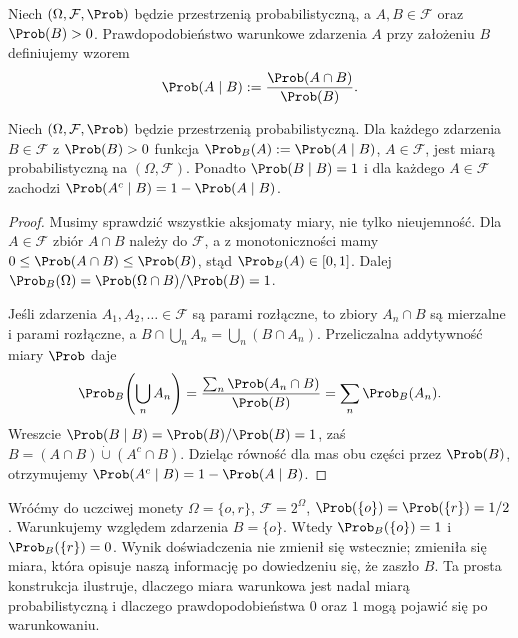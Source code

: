 \begin{definicja}
Niech $(\Omega,\mathcal F,\Prob)$ będzie przestrzenią probabilistyczną,
a $A,B\in\mathcal F$ oraz $\Prob(B)>0$.
Prawdopodobieństwo warunkowe zdarzenia $A$ przy założeniu $B$
definiujemy wzorem
\begin{equation}\label{eq:cond}
\Prob(A\mid B):=\frac{\Prob(A\cap B)}{\Prob(B)}.
\end{equation}
\end{definicja}

\begin{stwierdzenie}
Niech $(\Omega,\mathcal F,\Prob)$ będzie przestrzenią probabilistyczną.
Dla każdego zdarzenia $B\in\mathcal F$ z $\Prob(B)>0$
funkcja $\Prob_B(A):=\Prob(A\mid B)$, $A\in\mathcal F$,
jest miarą probabilistyczną na $(\Omega,\mathcal F)$.
Ponadto $\Prob(B\mid B)=1$ i dla każdego $A\in\mathcal F$
zachodzi $\Prob(A^c\mid B)=1-\Prob(A\mid B)$.
\end{stwierdzenie}
\begin{proof}
Musimy sprawdzić wszystkie aksjomaty miary, nie tylko
nieujemność. Dla $A\in\mathcal F$ zbiór $A\cap B$ należy do $\mathcal F$,
a z monotoniczności mamy $0\leq\Prob(A\cap B)\leq\Prob(B)$, stąd
$\Prob_B(A)\in[0,1]$. Dalej
$\Prob_B(\Omega)=\Prob(\Omega\cap B)/\Prob(B)=1$.

Jeśli zdarzenia $A_1,A_2,\ldots\in\mathcal F$ są parami rozłączne,
to zbiory $A_n\cap B$ są mierzalne i parami rozłączne, a
$B\cap\bigcup_n A_n=\bigcup_n(B\cap A_n)$.
Przeliczalna addytywność miary $\Prob$ daje
\[
\Prob_B\!\left(\bigcup_n A_n\right)
=\frac{\sum_n\Prob(A_n\cap B)}{\Prob(B)}
=\sum_n\Prob_B(A_n).
\]
Wreszcie $\Prob(B\mid B)=\Prob(B)/\Prob(B)=1$, zaś
$B=(A\cap B)\mathbin{\dot\cup}(A^c\cap B)$.
Dzieląc równość dla mas obu części przez $\Prob(B)$,
otrzymujemy $\Prob(A^c\mid B)=1-\Prob(A\mid B)$.
\end{proof}


\begin{przyklad}
Wróćmy do uczciwej monety
$\Omega=\{o,r\}$, $\mathcal F=2^\Omega$,
$\Prob(\{o\})=\Prob(\{r\})=1/2$.
Warunkujemy względem zdarzenia $B=\{o\}$.
Wtedy $\Prob_B(\{o\})=1$ i $\Prob_B(\{r\})=0$.
Wynik doświadczenia nie zmienił się wstecznie;
zmieniła się miara, która opisuje naszą informację
po dowiedzeniu się, że zaszło $B$.
Ta prosta konstrukcja ilustruje, dlaczego miara warunkowa
jest nadal miarą probabilistyczną i dlaczego prawdopodobieństwa
$0$ oraz $1$ mogą pojawić się po warunkowaniu.
\end{przyklad}

